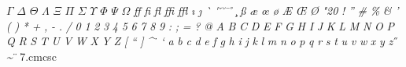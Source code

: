\documentclass{article}
\begin{document}
\noindent $\mathit{\Gamma}$ $\mathit{\Delta}$ $\mathit{\Theta}$ $\mathit{\Lambda}$ $\mathit{\Xi}$ $\mathit{\Pi}$ $\mathit{\Sigma}$ $\mathit{\Upsilon}$ $\mathit{\Phi}$ $\mathit{\Psi}$ $\mathit{\Omega}$ \textit{ff} \textit{fi} \textit{fl} \textit{ffi} \textit{ffl} \textit{\i} \textit{\j} \textit{\`} \textit{\'} \textit{\v} \textit{\u} \textit{\=} \textit{\r} \textit{\c} \textit{\ss} \textit{\ae} \textit{\oe} \textit{\o} \textit{\AE} \textit{\OE} \textit{\O} \textit{\selectfont\char"20} \textit{!} \textit{\textquotedblright} \textit{\#} \textit{\textsterling} \textit{\%} \textit{\&} \textit{'} \textit{(} \textit{)} \textit{*} \textit{+} \textit{,} \textit{-} \textit{.} \textit{/} \textit{0} \textit{1} \textit{2} \textit{3} \textit{4} \textit{5} \textit{6} \textit{7} \textit{8} \textit{9} \textit{:} \textit{;} \textit{\textexclamdown} \textit{=} \textit{\textquestiondown} \textit{?} \textit{@} \textit{A} \textit{B} \textit{C} \textit{D} \textit{E} \textit{F} \textit{G} \textit{H} \textit{I} \textit{J} \textit{K} \textit{L} \textit{M} \textit{N} \textit{O} \textit{P} \textit{Q} \textit{R} \textit{S} \textit{T} \textit{U} \textit{V} \textit{W} \textit{X} \textit{Y} \textit{Z} \textit{[} \textit{\textquotedblleft} \textit{]} \textit{\^} \textit{\.} \textit{\textquoteleft} \textit{a} \textit{b} \textit{c} \textit{d} \textit{e} \textit{f} \textit{g} \textit{h} \textit{i} \textit{j} \textit{k} \textit{l} \textit{m} \textit{n} \textit{o} \textit{p} \textit{q} \textit{r} \textit{s} \textit{t} \textit{u} \textit{v} \textit{w} \textit{x} \textit{y} \textit{z} \textit{\textendash} \textit{\textemdash} \textit{\H} \textit{\~} \textit{\"}
7.cmcsc\\
\end{document}
